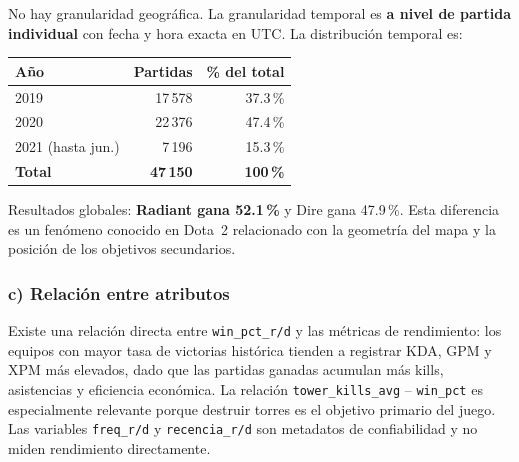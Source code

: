 \documentclass[12pt,a4paper]{article}
\begin{document}
No hay granularidad geogr\'afica. La granularidad temporal es \textbf{a nivel de
partida individual} con fecha y hora exacta en UTC. La distribuci\'on temporal es:

\begin{center}
\begin{tabular}{lrr}
  \toprule
  \textbf{A\~no} & \textbf{Partidas} & \textbf{\% del total} \\
  \midrule
  2019              & 17\,578 & 37.3\,\% \\
  2020              & 22\,376 & 47.4\,\% \\
  2021 (hasta jun.) &  7\,196 & 15.3\,\% \\
  \midrule
  \textbf{Total}   & \textbf{47\,150} & \textbf{100\,\%} \\
  \bottomrule
\end{tabular}
\end{center}

Resultados globales: \textbf{Radiant gana 52.1\,\%} y Dire gana 47.9\,\%.
Esta diferencia es un fen\'omeno conocido en Dota~2 relacionado con la geometr\'ia
del mapa y la posici\'on de los objetivos secundarios.

\subsubsection*{c) Relaci\'on entre atributos}

Existe una relaci\'on directa entre \texttt{win\_pct\_r/d} y las m\'etricas de
rendimiento: los equipos con mayor tasa de victorias hist\'orica tienden a registrar
KDA, GPM y XPM m\'as elevados, dado que las partidas ganadas acumulan m\'as kills,
asistencias y eficiencia econ\'omica. La relaci\'on \texttt{tower\_kills\_avg} --
\texttt{win\_pct} es especialmente relevante porque destruir torres es el objetivo
primario del juego. Las variables \texttt{freq\_r/d} y \texttt{recencia\_r/d} son
metadatos de confiabilidad y no miden rendimiento directamente.
\end{document}
